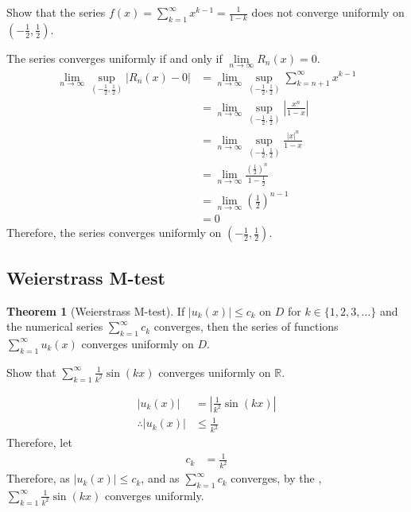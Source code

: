 \documentclass[fleqn, a4paper, 12pt, twoside]{article}
\theoremstyle{definition}
\theoremstyle{theorem}
\newtheorem{theorem}{Theorem}
\begin{document}
{\begin{question}
	Show that the series $f(x) = \sum\limits_{k = 1}^{\infty} x^{k - 1} = \frac{1}{1 - k}$  does not converge uniformly on $\left( -\frac{1}{2} , \frac{1}{2} \right)$.
\end{question}

\begin{solution}
	The series converges uniformly if and only if $\lim\limits_{n \to \infty} R_n(x) = 0$.
	\begin{align*}
		\lim\limits_{n \to \infty} \sup\limits_{\left( -\frac{1}{2} , \frac{1}{2} \right)} |R_n(x) - 0| &= \lim\limits_{n \to \infty} \sup\limits_{\left( -\frac{1}{2} , \frac{1}{2} \right)} \sum\limits_{k = n + 1}^{\infty} x^{k - 1}\\
		&= \lim\limits_{n \to \infty} \sup\limits_{\left( -\frac{1}{2} , \frac{1}{2} \right)} \left| \frac{x^n}{1 - x} \right|\\
		&= \lim\limits_{n \to \infty} \sup\limits_{\left( -\frac{1}{2} , \frac{1}{2} \right)} \frac{|x|^n}{1 - x}\\
		&= \lim\limits_{n \to \infty} \frac{\left( \frac{1}{2} \right)^n}{1 - \frac{1}{2}}\\
		&= \lim\limits_{n \to \infty} \left( \frac{1}{2} \right)^{n - 1}\\
		&= 0
	\end{align*}
	Therefore, the series converges uniformly on $\left( -\frac{1}{2} , \frac{1}{2} \right)$.
\end{solution}

\subsection{Weierstrass M-test}

\begin{theorem}[Weierstrass M-test]
	If $|u_k(x)| \le c_k$ on $D$ for $k \in \{ 1, 2, 3, \dots \}$ and the numerical series $\sum\limits_{k = 1}^{\infty} c_k$ converges, then the series of functions $\sum\limits_{k = 1}^{\infty} u_k(x)$ converges uniformly on $D$.
	\label{Weierstrass_M-test}
\end{theorem}

\begin{question}
	Show that $\sum\limits_{k = 1}^{\infty} \frac{1}{k^2} \sin(k x)$ converges uniformly on $\mathbb{R}$.
\end{question}

\begin{solution}
	\begin{align*}
		|u_k(x)| &= \left| \frac{1}{k^2} \sin(k x) \right|\\
		\therefore |u_k(x)| &\le \frac{1}{k^2}
	\end{align*}
	Therefore, let
	\begin{align*}
		c_k &= \frac{1}{k^2}
	\end{align*}
	Therefore, as $|u_k(x)| \le c_k$, and as $\sum\limits_{k = 1}^{\infty} c_k$ converges, by the , $\sum\limits_{k = 1}^{\infty} \frac{1}{k^2} \sin(k x)$ converges uniformly.
\end{solution}

}
\end{document}

